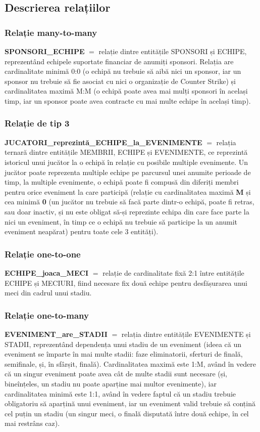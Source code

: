 \documentclass[a4paper,11pt]{article}
\begin{document}
\subsection{Descrierea relațiilor}
\subsubsection{Relație many-to-many}
\textbf{SPONSORI\_ECHIPE} \texttt{$=$} relație dintre entitățile SPONSORI și ECHIPE, reprezentând echipele suportate financiar de anumiți sponsori. Relația are cardinalitate minimă 0:0 (o echipă nu trebuie să aibă nici un sponsor, iar un sponsor nu trebuie să fie asociat cu nici o organizație de Counter Strike) și cardinalitatea maximă M:M (o echipă poate avea mai mulți sponsori în același timp, iar un sponsor poate avea contracte cu mai multe echipe în același timp).

\subsubsection{Relație de tip 3}
\textbf{JUCATORI\_reprezintă\_ECHIPE\_la\_EVENIMENTE} \texttt{$=$} relația ternară dintre entitățile MEMBRII, ECHIPE și EVENIMENTE, ce reprezintă istoricul unui jucător la o echipă în relație cu posibile multiple evenimente. Un jucător poate reprezenta multiple echipe pe parcursul unei anumite perioade de timp, la multiple evenimente, o echipă poate fi compusă din diferiți membri pentru orice eveniment la care participă (relație cu cardinalitatea maximă \textbf{M} și cea minimă \textbf{0} (un jucător nu trebuie să facă parte dintr-o echipă, poate fi retras, sau doar inactiv, și nu este obligat să-și reprezinte echipa din care face parte la nici un eveniment, în timp ce o echipă nu trebuie să participe la un anumit eveniment neapărat) pentru toate cele 3 entități).

\subsubsection{Relație one-to-one}
\textbf{ECHIPE\_joaca\_MECI} \texttt{$=$} relație de cardinalitate fixă 2:1 între entitățile ECHIPE și MECIURI, fiind necesare fix două echipe pentru desfășurarea unui meci din cadrul unui stadiu.

\subsubsection{Relație one-to-many}
\textbf{EVENIMENT\_are\_STADII} \texttt{$=$} relația dintre entitățile EVENIMENTE și STADII, reprezentând dependența unui stadiu de un eveniment (ideea că un eveniment se împarte în mai multe stadii: faze eliminatorii, sferturi de finală, semifinale, și, în sfârșit, finală). Cardinalitatea maximă este 1:M, având în vedere că un singur eveniment poate avea cât de multe stadii sunt necesare (și, bineînțeles, un stadiu nu poate aparține mai multor evenimente), iar cardinalitatea minimă este 1:1, având în vedere faptul că un stadiu trebuie obligatoriu să aparțină unui eveniment, iar un eveniment valid trebuie să conțină cel puțin un stadiu (un singur meci, o finală disputată între două echipe, în cel mai restrâns caz). 
\end{document}

